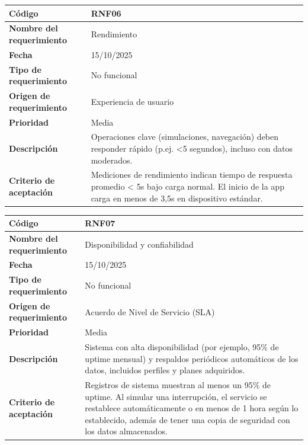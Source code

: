 \begin{table}[H]
	\begin{tabular}{|s{5cm}|m{11cm}|}
		\hline
		\textbf{Código} & RNF06 \\ \hline
		\textbf{Nombre del requerimiento} & Rendimiento \\ \hline
		\textbf{Fecha} & 15/10/2025 \\ \hline
		\textbf{Tipo de requerimiento} & No funcional \\ \hline
		\textbf{Origen de requerimiento} & Experiencia de usuario \\ \hline
		\textbf{Prioridad} & Media \\ \hline
		\textbf{Descripción} & Operaciones clave (simulaciones, navegación) deben responder rápido (p.ej. <5 segundos), incluso con datos moderados. \\ \hline
		\textbf{Criterio de aceptación} & Mediciones de rendimiento indican tiempo de respuesta promedio < 5s bajo carga normal. El inicio de la app carga en menos de 3,5s en dispositivo estándar. \\ \hline
	\end{tabular}
\end{table}

\begin{table}[H]
	\begin{tabular}{|s{5cm}|m{11cm}|}
		\hline
		\textbf{Código} & RNF07 \\ \hline
		\textbf{Nombre del requerimiento} & Disponibilidad y confiabilidad \\ \hline
		\textbf{Fecha} & 15/10/2025 \\ \hline
		\textbf{Tipo de requerimiento} & No funcional \\ \hline
		\textbf{Origen de requerimiento} & Acuerdo de Nivel de Servicio (SLA) \\ \hline
		\textbf{Prioridad} & Media \\ \hline
		\textbf{Descripción} & Sistema con alta disponibilidad (por ejemplo, 95\% de uptime mensual) y respaldos periódicos automáticos de los datos, incluidos perfiles y planes adquiridos. \\ \hline
		\textbf{Criterio de aceptación} & Registros de sistema muestran al menos un 95\% de uptime. Al simular una interrupción, el servicio se restablece automáticamente o en menos de 1 hora según lo establecido, además de tener una copia de seguridad con los datos almacenados. \\ \hline
	\end{tabular}
\end{table}

